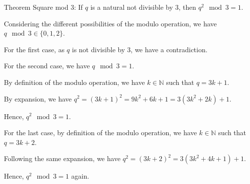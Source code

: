 Theorem Square mod 3: If $q$ is a natural not divisible by $3$, then $q^2 \mod 3 = 1$.

Considering the different possibilities of the modulo operation, we have $q \mod 3 \in \{ 0, 1, 2 \}$.

For the first case, as $q$ is not divisible by $3$, we have a contradiction.

For the second case, we have $q \mod 3 = 1$.

By definition of the modulo operation, we have $k \in \mathbb{N}$ such that $q = 3k + 1$.

By expansion, we have $q^2 = (3k+1)^2 = 9k^2+6k+1 = 3(3k^2 + 2k) + 1$.

Hence, $q^2 \mod 3 = 1$.

For the last case, by definition of the modulo operation, we have $k \in \mathbb{N}$ such that $q = 3k + 2$.

Following the same expansion, we have $q^2 = (3k+2)^2 = 3(3k^2+4k+1) +1$.

Hence, $q^2 \mod 3 = 1$ again.